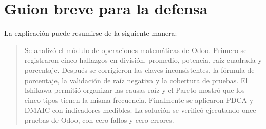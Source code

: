 \documentclass{article}
\begin{document}
\section{Guion breve para la defensa}
La explicación puede resumirse de la siguiente manera:

\begin{quote}
Se analizó el módulo de operaciones matemáticas de Odoo. Primero se registraron cinco hallazgos en división, promedio, potencia, raíz cuadrada y porcentaje. Después se corrigieron las claves inconsistentes, la fórmula de porcentaje, la validación de raíz negativa y la cobertura de pruebas. El Ishikawa permitió organizar las causas raíz y el Pareto mostró que los cinco tipos tienen la misma frecuencia. Finalmente se aplicaron PDCA y DMAIC con indicadores medibles. La solución se verificó ejecutando once pruebas de Odoo, con cero fallos y cero errores.
\end{quote}



\nocite{*}
\end{document}
